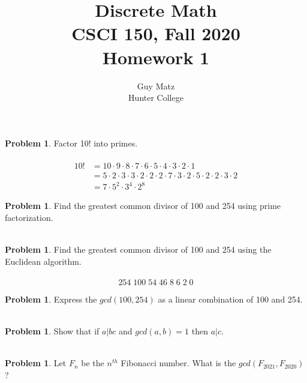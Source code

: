 \documentclass[10pt,leqno ]{article}
\title{Discrete Math\\
CSCI 150, Fall 2020\\
Homework 1}
\author{Guy Matz \\
Hunter College}
\theoremstyle{definition}
\newtheorem{problem}[theorem]{Problem}
\begin{document}
\begin{problem} Factor 10! into primes.
\\\\
\Large
\begin{align*}
10! &= 10 \cdot 9 \cdot 8 \cdot 7  \cdot  6  \cdot  5  \cdot 4 \cdot 3 \cdot 2 \cdot 1\\
    &= 5 \cdot 2 \cdot 3 \cdot 3 \cdot 2 \cdot 2 \cdot 2 \cdot 7 \cdot 3 \cdot 2 \cdot 5 \cdot 2 \cdot 2 \cdot 3 \cdot 2\\
    &= 7 \cdot 5^2 \cdot 3^4 \cdot 2^8
\end{align*}
\end{problem}
\newpage

\begin{problem} Find the greatest common divisor of 100 and 254 using prime factorization.
\\\\
\Large

\end{problem}
\newpage

\begin{problem} Find  the  greatest  common  divisor  of  100  and  254  using  the  Euclidean algorithm.
\\\\
\Large
$$254 \; 100 \; 54 \; 46 \; 8 \; 6 \; 2 \; 0$$
\end{problem}
\newpage

\begin{problem} Express the $gcd(100,254)$ as a linear combination of 100 and 254.
\\\\
\Large
\end{problem}
\newpage

\begin{problem} Show that if $a|bc$ and $gcd(a, b) = 1$ then $a|c$.
\\\\
\Large
\end{problem}
\newpage

\begin{problem} Let $F_n$ be the $n^{th}$ Fibonacci number.  What is the $gcd(F_{2021}, F_{2020})$?
\\\\
\Large
\end{problem}
\newpage
\end{document}
